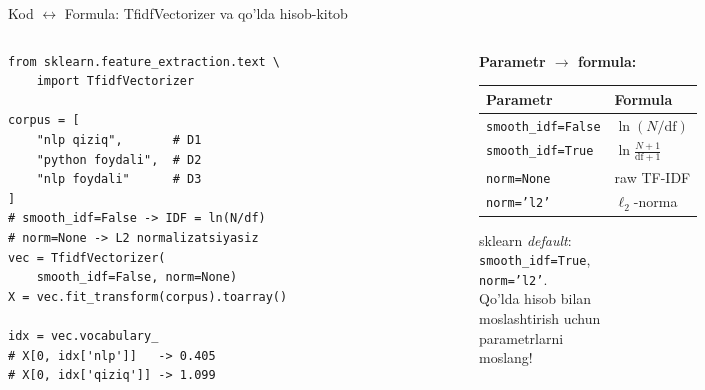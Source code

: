 \documentclass[aspectratio=169,11pt]{beamer}
\begin{document}
\begin{frame}[fragile]{Kod $\leftrightarrow$ Formula: TfidfVectorizer va qo'lda hisob-kitob}
  \begin{columns}[T]
    \begin{column}{0.54\textwidth}
\begin{lstlisting}[title=tfidf\_demo.py]
from sklearn.feature_extraction.text \
    import TfidfVectorizer

corpus = [
    "nlp qiziq",       # D1
    "python foydali",  # D2
    "nlp foydali"      # D3
]
# smooth_idf=False -> IDF = ln(N/df)
# norm=None -> L2 normalizatsiyasiz
vec = TfidfVectorizer(
    smooth_idf=False, norm=None)
X = vec.fit_transform(corpus).toarray()

idx = vec.vocabulary_
# X[0, idx['nlp']]   -> 0.405
# X[0, idx['qiziq']] -> 1.099
\end{lstlisting}
    \end{column}
    \begin{column}{0.43\textwidth}
      \small\textbf{Parametr $\to$ formula:}\\[4pt]
      \footnotesize
      \begin{tabular}{p{2.7cm}l}
        \toprule
        Parametr & Formula \\
        \midrule
        \texttt{smooth\_idf=False} & $\ln(N/\mathrm{df})$ \\
        \texttt{smooth\_idf=True} & $\ln\frac{N+1}{\mathrm{df}+1}$ \\
        \texttt{norm=None} & raw TF-IDF \\
        \texttt{norm='l2'} & $\ell_2$-norma \\
        \bottomrule
      \end{tabular}
      \vspace{5pt}
      \begin{tcolorbox}[warnbox,title=Ehtiyotlik bilan ishlating,top=2pt,bottom=2pt]
        \footnotesize
        sklearn \textit{default}:\\
        \texttt{smooth\_idf=True},\\
        \texttt{norm='l2'}.\\
        Qo'lda hisob bilan\\
        moslashtirish uchun\\
        parametrlarni\\
        moslang!
      \end{tcolorbox}
    \end{column}
  \end{columns}
\end{frame}
\end{document}
